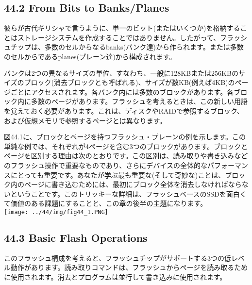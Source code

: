 \hypertarget{from-bits-to-banksplanes}{%
\subsection*{44.2 From Bits to
Banks/Planes}\label{from-bits-to-banksplanes}}

彼らが古代ギリシャで言うように、単一のビット(またはいくつか)を格納することはストレージシステムを作成することではありません。したがって、フラッシュチップは、多数のセルからなるbanks(バンク達)から作られます。または多数のセルからであるplanes(プレーン達)から構成されます。

バンクは2つの異なるサイズの単位、すなわち、一般に128KBまたは256KBのサイズのブロック(消去ブロックとも呼ばれる)、サイズが数KB(例えば4KB)のページごとにアクセスされます。各バンク内には多数のブロックがあります。各ブロック内に多数のページがあります。フラッシュを考えるときは、この新しい用語を覚えておく必要があります。これは、ディスクやRAIDで参照するブロック、および仮想メモリで参照するページとは異なります。

図44.1に、ブロックとページを持つフラッシュ・プレーンの例を示します。この単純な例では、それぞれが4ページを含む3つのブロックがあります。ブロックとページを区別する理由は次のとおりです。この区別は、読み取りや書き込みなどのフラッシュ操作で重要なものであり、さらにデバイスの全体的なパフォーマンスにとっても重要です。あなたが学ぶ最も重要な(そして奇妙な)ことは、ブロック内のページに書き込むためには、最初にブロック全体を消去しなければならないということです。このトリッキーな詳細は、フラッシュベースのSSDを面白くて価値のある課題にすることと、この章の後半の主題になります。\\
\texttt{[image: ../44/img/fig44\_1.PNG]}

\hypertarget{basic-flash-operations}{%
\subsection*{44.3 Basic Flash Operations}\label{basic-flash-operations}}

このフラッシュ構成を考えると、フラッシュチップがサポートする3つの低レベル動作があります。読み取りコマンドは、フラッシュからページを読み取るために使用されます。消去とプログラムは並行して書き込みに使用されます。

